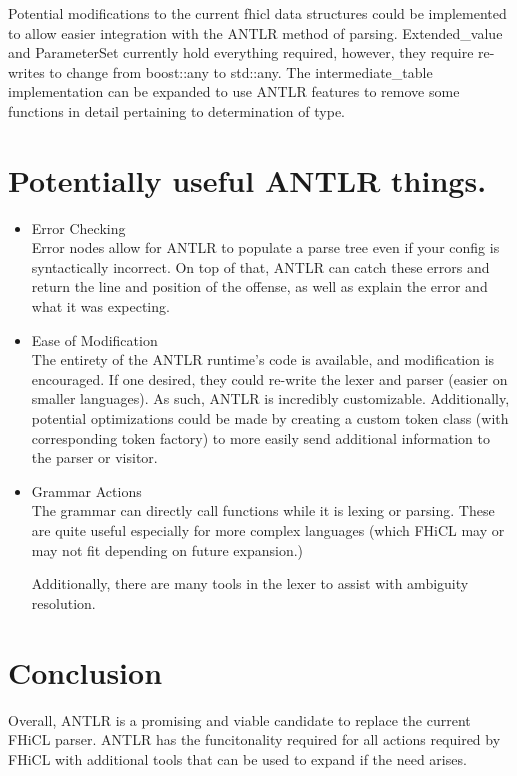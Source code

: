 \documentclass{article}
\begin{document}
    Potential modifications to the current fhicl data structures could be implemented to allow easier integration with the ANTLR method of parsing. Extended\_value and ParameterSet currently hold everything required, however, they require re-writes to change from boost::any to std::any. The intermediate\_table implementation can be expanded to use ANTLR features to remove some functions in detail pertaining to determination of type.

\section{Potentially useful ANTLR things.}
\begin{itemize}
  \item Error Checking \\
      \quad Error nodes allow for ANTLR to populate a parse tree even if your config is syntactically incorrect. On top of that, ANTLR can catch these errors and return the line and position of the offense, as well as explain the error and what it was expecting. 

  \item Ease of Modification \\
      \quad The entirety of the ANTLR runtime's code is available, and modification is encouraged. If one desired, they could re-write the lexer and parser (easier on smaller languages). As such, ANTLR is incredibly customizable. Additionally, potential optimizations could be made by creating a custom token class (with corresponding token factory) to more easily send additional information to the parser or visitor. 

 \item Grammar Actions\\
      \quad The grammar can directly call functions while it is lexing or parsing. These are quite useful especially for more complex languages (which FHiCL may or may not fit depending on future expansion.) 

      Additionally, there are many tools in the lexer to assist with ambiguity resolution. 
\end{itemize}
\section{Conclusion}
	Overall, ANTLR is a promising and viable candidate to replace the current FHiCL parser. ANTLR has the funcitonality required for all actions required by FHiCL with additional tools that can be used to expand if the need arises. 
\end{document}
